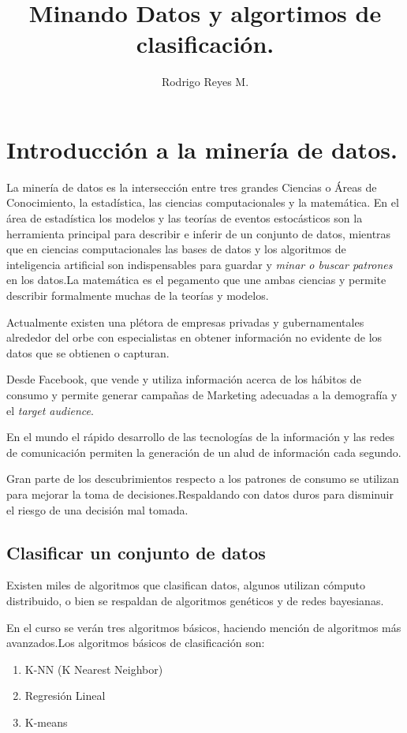 \documentclass{article}
\title{Minando Datos y algortimos de clasificación.}
\author{Rodrigo Reyes M.}
\begin{document}
\maketitle

\section{Introducción a la minería de datos.}
La minería de datos es la intersección entre tres grandes Ciencias o Áreas de Conocimiento, la estadística, las ciencias computacionales y la matemática.
En el área de estadística los modelos y las teorías de eventos estocásticos son la herramienta principal para describir e inferir de un conjunto de datos, mientras que en ciencias computacionales las bases de datos y los algoritmos de inteligencia artificial son indispensables para guardar y \textit{minar o buscar patrones} en los datos.La matemática es el pegamento que une ambas ciencias y permite describir formalmente muchas de la teorías y modelos.

Actualmente existen una plétora de empresas privadas y gubernamentales alrededor del orbe con especialistas en obtener información no evidente de los datos que se obtienen o capturan.

Desde Facebook, que vende y utiliza información acerca de los hábitos de consumo y permite generar campañas de Marketing adecuadas a la demografía y el \textit{target audience}.

En el mundo el rápido desarrollo de las tecnologías de la información y las redes de comunicación permiten la generación de un alud de información cada segundo.

Gran parte de los descubrimientos respecto a los patrones de consumo se utilizan para mejorar la toma de decisiones.Respaldando con datos duros para disminuir el riesgo de una decisión mal tomada.



\subsection{Clasificar un conjunto de datos}
Existen miles de algoritmos que clasifican datos, algunos utilizan cómputo distribuido, o bien se respaldan de algoritmos genéticos y de redes bayesianas.

En el curso se verán tres algoritmos básicos, haciendo mención de algoritmos más avanzados.Los algoritmos básicos de clasificación son:
\begin{enumerate}
\item K-NN (K Nearest Neighbor)
\item Regresión Lineal
\item K-means
\end{enumerate}
\end{document}
